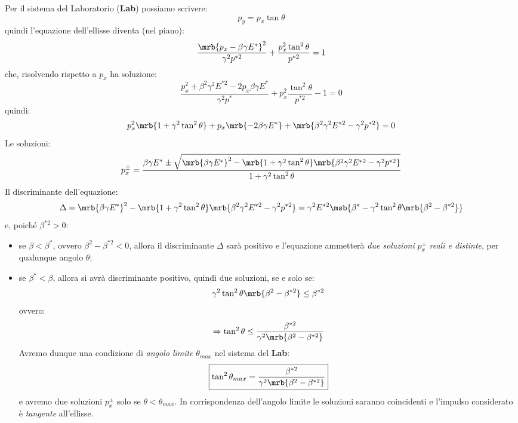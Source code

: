 Per il sistema del Laboratorio (\textbf{Lab}) possiamo scrivere:
\begin{equation}
	p_y = p_x \tan \theta
\end{equation}
quindi l'equazione dell'ellisse diventa (nel piano):
\begin{equation}
	\frac{\mrb{p_x - \beta \gamma E^\ast}^2}{\gamma^2 p^{\ast2}}
	+ \frac{p_x^2 \tan^2 \theta}{p^{\ast2}}
	= 1
\end{equation}
che, risolvendo rispetto a $p_x$ ha soluzione:
\begin{equation}
	\frac{p_x^2 + \beta^2 \gamma^2 E^{\ast2} - 2 p_x \beta \gamma E^\ast}{\gamma^2 p^\ast}
	+ p_x^2 \frac{\tan^2 \theta}{p^{\ast2}}
	- 1
	= 0
\end{equation}
quindi:
\begin{equation}
	p_x^2 \mrb{1 + \gamma^2 \tan^2 \theta}
	+ p_x \mrb{-2 \beta \gamma E^\ast}
	+ \mrb{\beta^2 \gamma^2 E^{\ast2}
		- \gamma^2 p^{\ast2}}
	= 0
\end{equation}
Le soluzioni:
\begin{equation}
	p_x^\pm = \frac{\beta \gamma E^\ast \pm \sqrt{\mrb{\beta \gamma
				E^\ast}^2 - \mrb{1 + \gamma^2 \tan^2 \theta} \mrb{\beta^2 \gamma^2 E^{\ast2} -
				\gamma^2 p^{\ast2}}}}{1 + \gamma^2 \tan^2 \theta}
\end{equation}
Il discriminante dell'equazione:
\begin{equation}
	\Delta = \mrb{\beta \gamma E^\ast}^2 - \mrb{1 + \gamma^2 \tan^2 \theta}
	\mrb{\beta^2 \gamma^2 E^{\ast2} - 			\gamma^2 p^{\ast2}} = \gamma^2 E^{\ast2}
	\msb{\beta^\ast - \gamma^2 \tan^2 \theta \mrb{\beta^2 - \beta^{\ast2}}}
\end{equation}
e, poiché $\beta^{\ast2} > 0$:
\begin{itemize}
	\item se $\beta < \beta^\ast$, ovvero $\beta^2 - \beta^{\ast2} < 0$, allora il
	      discriminante $\Delta$ sarà positivo e l'equazione ammetterà \textit{due
		      soluzioni} $p_x^\pm$ \textit{reali e distinte}, per qualunque angolo
	      $\theta$;
	\item se $\beta^\ast < \beta$, allora si avrà discriminante positivo, quindi due
	      soluzioni, se e solo se:
	      \begin{equation}
		      \gamma^2 \tan^2 \theta \mrb{\beta^2 - \beta^{\ast2}} \leq \beta^{\ast2}
	      \end{equation}
	      ovvero:
	      \begin{equation}
		      \Rightarrow \tan^2 \theta \leq \frac{\beta^{\ast2}}{\gamma^2 \mrb{\beta^2
				      - \beta^{\ast2}}}
	      \end{equation}
	      Avremo dunque una condizione di \textit{angolo limite} $\theta_{max}$ nel
	      sistema del \textbf{Lab}:
	      \begin{equation}
		      \boxed{
			      \tan^2 \theta_{max}
			      = \frac{\beta^{\ast2}}{\gamma^2 \mrb{\beta^2 - \beta^{\ast 2}}}
		      }
	      \end{equation}
	      e avremo due soluzioni $p_x^\pm$ solo se $\theta < \theta_{max}$. In
	      corrispondenza dell'angolo limite le soluzioni saranno coincidenti e
	      l'impulso considerato è \textit{tangente} all'ellisse.
\end{itemize}

